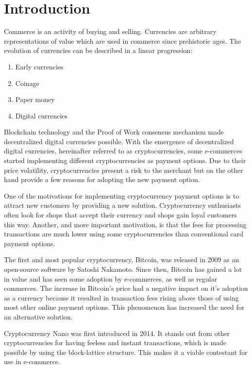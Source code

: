 \documentclass{ferseminar}
\begin{document}
\stvoripredstranice
\section{Introduction}
Commerce is an activity of buying and selling. Currencies are arbitrary representations of value which are used in commerce since prehistoric ages. The evolution of currencies can be described in a linear progression:

\begin{enumerate}
	\item Early currencies
	\item Coinage
	\item Paper money
	\item Digital currencies
\end{enumerate}

Blockchain technology and the Proof of Work consensus mechanism \cite{Bitcoin} made decentralized digital currencies possible. With the emergence of decentralized digital currencies, hereinafter referred to as cryptocurrencies, some e-commerces started implementing different cryptocurrencies as payment options. Due to their price volatility, cryptocurrencies present a risk to the merchant but on the other hand provide a few reasons for adopting the new payment option.

One of the motivations for implementing cryptocurrency payment options is to attract new customers by providing a new solution. Cryptocurrency enthusiasts often look for shops that accept their currency and shops gain loyal customers this way. Another, and more important motivation, is that the fees for processing transactions are much lower using some cryptocurrencies than conventional card payment options.

The first and most popular cryptocurrency, Bitcoin, was released in 2009 as an open-source software by Satoshi Nakamoto. Since then, Bitcoin has gained a lot in value and has seen some adoption by e-commerces, as well as regular commerces. The increase in Bitcoin's price had a negative impact on it's adoption as a currency because it resulted in transaction fees rising above those of using most other online payment options. This phenomenon has increased the need for an alternative solution.

Cryptocurrency Nano was first introduced in 2014. It stands out from other cryptocurrencies for having feeless and instant transactions, which is made possible by using the block-lattice structure. This makes it a viable contestant for use in e-commerce.
\end{document}
